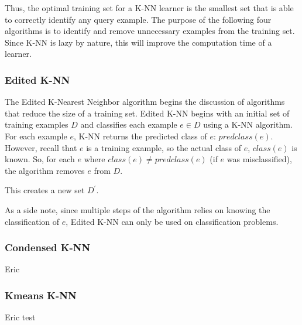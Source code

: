 \documentclass[twoside,11pt]{article}
\begin{document}
Thus, the optimal training set for a K-NN learner is the smallest set that is able to correctly identify any query example.
The purpose of the following four algorithms is to identify and remove unnecessary examples from the training set. Since K-NN is lazy by nature, this will improve the computation time of a learner.


\subsubsection{Edited K-NN}
The Edited K-Nearest Neighbor algorithm begins the discussion of algorithms that reduce the size of a training set. Edited K-NN begins with an initial set of training examples $D$ and classifies each example $e \in D$ using a K-NN algorithm. For each example $e$, K-NN returns the predicted class of $e$: $predclass(e)$. However, recall that $e$ is a training example, so the actual class of $e$, $class(e)$ is known. So, for each $e$ where $class(e) \neq predclass(e)$ (if $e$ was misclassified), the algorithm removes $e$ from $D$.

This creates a new set $D^\prime$. 

As a side note, since multiple steps of the algorithm relies on knowing the classification of $e$, Edited K-NN can only be used on classification problems.



\subsubsection{Condensed K-NN}

Eric

\subsubsection{Kmeans K-NN}

Eric test
\end{document}
